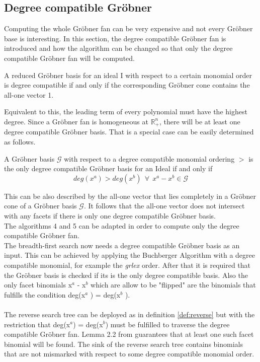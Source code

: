 \subsection{Degree compatible Gröbner}
\label{subsec:degreecomp}
Computing the whole Gröbner fan can be very expensive and not every Gröbner base is interesting.
In this section, the degree compatible Gröbner fan is introduced and how the algorithm can
be changed so that only the degree compatible Gröbner fan will be computed.\\
\begin{env_definition}
\cite{dueckpaper}
A reduced Gröbner basis for an ideal I with respect to a certain monomial order is
degree compatible if and only if the corresponding Gröbner cone contains the all-one vector 1.
\end{env_definition}
Equivalent to this, the leading term of every polynomial must have the highest degree.
Since a Gröbner fan is homogeneous at $\mathbb{R}^{n}_{+}$, there will be at least one degree compatible Gröbner basis.
That is a special case can be easily determined as follows.

\begin{env_definition}
\cite{dueckpaper}
A Gröbner basis $\mathcal{G}$ with respect to a degree compatible monomial ordering $>$  is the only degree compatible Gröbner basis for an Ideal if and only if
\[ deg(x^{a}) > deg(x^{b})~~ \forall~~ x^{a}-x^{b}\in \mathcal{G} \] 
\end{env_definition}

This can be also described by the all-one vector that lies completely in a Gröbner cone of a Gröbner basis $\mathcal{G}$.
It follows that the all-one vector does not intersect with any facets if there is only one degree compatible Gröbner basis. \\

The algorithms 4 and 5 can be adapted in order to compute only the degree compatible Gröbner fan.\\ 
The breadth-first search now needs a degree compatible Gröbner basis as an input. This can be achieved by applying the Buchberger Algorithm with a degree compatible monomial, for example the \textit{grlex} order. After that it is required that the Gröbner basis is checked if its is the only degree compatible basis. %
Also the only facet binomials x$^{a}$ - x$^{b}$ which are allow to be "flipped" are the binomials that fulfills the condition
deg(x$^{a}$ ) = deg(x$^{b} $ ). \\ \\
The reverse search tree can be deployed as in definition \ref{def:reverse} but with the restriction that deg(x$^{a}$) = deg(x$^{b}$) must be fulfilled to traverse the degree compatible Gröbner fan.
Lemma 2.2 from \cite{dueckpaper} guarantees that at least one such facet binomial will be found. 
The sink of the reverse search tree contains binomials that are not mismarked with respect to some degree compatible monomial order. 

